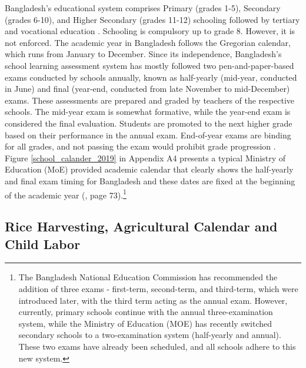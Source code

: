 \documentclass[12pt,letterpaper]{article}
\newcommand{\0}{\ensuremath{\mbox{\boldmath $0$}}}
\begin{document}
Bangladesh's educational system comprises Primary (grades 1-5), Secondary (grades 6-10), and Higher Secondary (grades 11-12) schooling followed by tertiary and vocational education \citep{kono2018primary}. Schooling is compulsory up to grade 8. However, it is not enforced. The academic year in Bangladesh follows the Gregorian calendar, which runs from January to December. Since its independence, Bangladesh's school learning assessment system has mostly followed two pen-and-paper-based exams conducted by schools annually, known as half-yearly (mid-year, conducted in June) and final (year-end, conducted from late November to mid-December) exams. These assessments are prepared and graded by teachers of the respective schools. The mid-year exam is somewhat formative, while the year-end exam is considered the final evaluation. Students are promoted to the next higher grade based on their performance in the annual exam. End-of-year exams are binding for all grades, and not passing the exam would prohibit grade progression \citep{de2004school,begum2008school,ADB2017}. Figure \ref{school_calander_2019} in Appendix A4 presents a typical Ministry of Education (MoE) provided academic calendar that clearly shows the half-yearly and final exam timing for Bangladesh and these dates are fixed at the beginning of the academic year (\cite{ADB2017}, page 73).\footnote{The Bangladesh National Education Commission has recommended the addition of three exams - first-term, second-term, and third-term, which were introduced later, with the third term acting as the annual exam. However, currently, primary schools continue with the annual three-examination system, while the Ministry of Education (MOE) has recently switched secondary schools to a two-examination system (half-yearly and annual). These two exams have already been scheduled, and all schools adhere to this new system.} 


\subsection{Rice Harvesting, Agricultural Calendar and Child Labor \label{sec.rice}}
\end{document}
